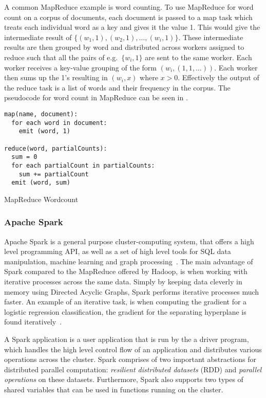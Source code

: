A common MapReduce example is word counting. To use MapReduce for word count on a corpus of documents, each document is passed to a map task which treats each individual word as a key and gives it the value 1. This would give the intermediate result of $\{(w_1,1), (w_2,1),\dots,(w_i,1)\} $. These intermediate results are then grouped by word and distributed across workers assigned to reduce such that all the pairs of e.g.\ $\{w_i,1\}$ are sent to the same worker. Each worker receives a key-value grouping of the form $(w_i, (1,1,\dots) )$. Each worker then sums up the 1's resulting in $(w_i, x)$ where $x>0$. Effectively the output of the reduce task is a list of words and their frequency in the corpus. The pseudocode for word count in MapReduce can be seen in . 
\begin{listing}[H]
\begin{verbatim}
map(name, document):
  for each word in document:
    emit (word, 1)

reduce(word, partialCounts):
  sum = 0
  for each partialCount in partialCounts:
    sum += partialCount
  emit (word, sum)
\end{verbatim}
\caption{MapReduce Wordcount}
\label{lst:mrwordcount}
\end{listing}

\subsubsection{Apache Spark}\label{sec:spark}
Apache Spark is a general purpose cluster-computing system, that offers a high level programming API, as well as a set of high level tools for SQL data manipulation, machine learning and graph processing~\cite{sparkintro}. The main advantage of Spark compared to the MapReduce offered by Hadoop, is when working with iterative processes across the same data. Simply by keeping data cleverly in memory using Directed Acyclic Graphs, Spark performs iterative processes much faster. An example of an iterative task, is when computing the gradient for a logistic regression classification, the gradient for the separating hyperplane is found iteratively~\cite{ApacheSpark}.

A Spark application is a user application that is run by the a driver program, which handles the high level control flow of an application and distributes various operations across the cluster. Spark comprises of two important abstractions for distributed parallel computation: \emph{resilient distributed datasets} (RDD) and \emph{parallel operations} on these datasets. Furthermore, Spark also supports two types of shared variables that can be used in functions running on the cluster.

